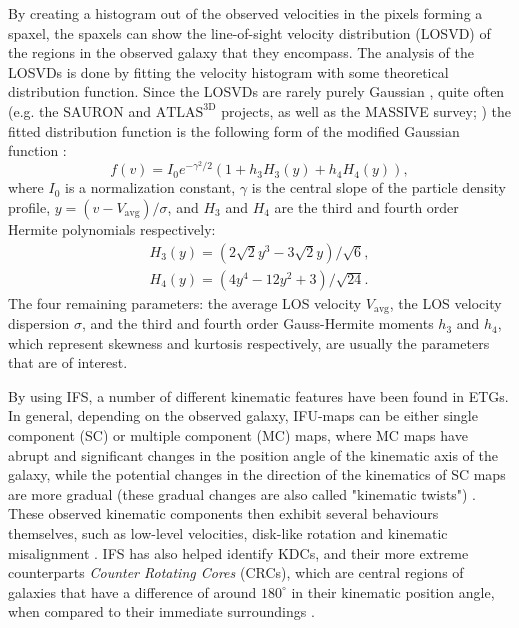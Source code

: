 \documentclass[english, oneside]{HYgradu}
\begin{document}
By creating a histogram out of the observed velocities in the pixels forming a spaxel, the spaxels can show the line-of-sight velocity distribution (LOSVD) of the regions in the observed galaxy that they encompass. The analysis of the LOSVDs is done by fitting the velocity histogram with some theoretical distribution function. Since the LOSVDs are rarely purely Gaussian \citep{GalaxyFormationAndEvo2010}, quite often  (e.g. the $\mathrm{SAURON}$ and $\mathrm{ATLAS^{3D}}$ projects, as well as the MASSIVE survey; \citealt{Bacon2001, Cappellari2011, Ma2014MASSIVE}) the fitted distribution function is the following form of the modified Gaussian function \citep{VanDerMarel1993, Bender1994}:
\begin{equation}
f(v) = I_0 e^{-\gamma^2/2}(1 + h_3 H_3(y) + h_4 H_4(y)), \label{eq:mod_gaussian}
\end{equation} 
where $I_0$ is a normalization constant, $\gamma$ is the central slope of the particle density profile, $y = (v - V_\mathrm{avg})/\sigma$, and $H_3$ and $H_4$ are the third and fourth order Hermite polynomials respectively:
\begin{eqnarray}
H_3(y) = \left(2\sqrt{2}y^3 - 3\sqrt{2}y\right) / \sqrt{6}, \\
H_4(y) = \left(4y^4 - 12y^2 + 3 \right) / \sqrt{24}.
\end{eqnarray}
The four remaining parameters: the average LOS velocity $V_\mathrm{avg}$, the LOS velocity dispersion $\sigma$, and the third and fourth order Gauss-Hermite moments $h_3$ and $h_4$, which represent skewness and kurtosis respectively, are usually the parameters that are of interest.

By using IFS, a number of different kinematic features have been found in ETGs. In general, depending on the observed galaxy, IFU-maps can be either single component (SC) or multiple component (MC) maps, where MC maps have abrupt and significant changes in the position angle of the kinematic axis of the galaxy, while the potential changes in the direction of the kinematics of SC maps are more gradual (these gradual changes are also called "kinematic twists") \citep{Krajnovic2006, Krajnovic2011}. These observed kinematic components then exhibit several behaviours themselves, such as low-level velocities, disk-like rotation and kinematic misalignment \citep{Emsellem2007}.  IFS has also helped identify KDCs, and their more extreme counterparts \textit{Counter Rotating Cores} (CRCs), which are central regions of galaxies that have a difference of around $180^\circ$ in their kinematic position angle, when compared to their immediate surroundings \citep{Krajnovic2011}.
\end{document}
